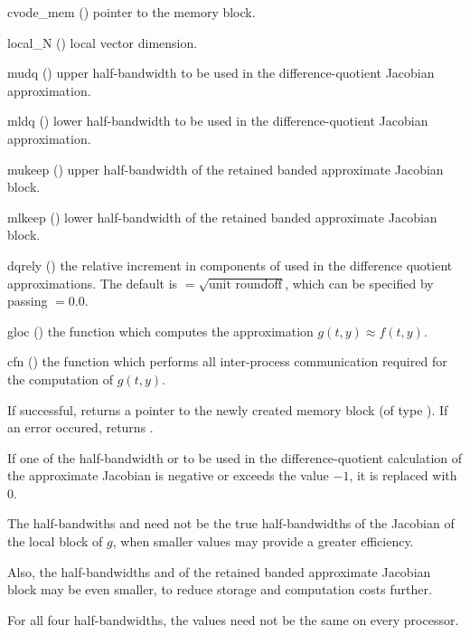 {
  \begin{args}
  \item[cvode\_mem] ()
    pointer to the {\cvode} memory block.
  \item[local\_N] ()
    local vector dimension.
  \item[mudq] ()
    upper half-bandwidth to be used in the difference-quotient Jacobian approximation.
  \item[mldq] ()
    lower half-bandwidth to be used in the difference-quotient Jacobian approximation.
  \item[mukeep] ()
    upper half-bandwidth of the retained banded approximate Jacobian block.
  \item[mlkeep] ()
    lower half-bandwidth of the retained banded approximate Jacobian block.
  \item[dqrely] ()
    the relative increment in components of  used in the difference quotient
    approximations.  The default is $ = \sqrt{\text{unit roundoff}}$, which
    can be specified by passing $ = 0.0$.
  \item[gloc] ()
    the {\C} function which computes the approximation $g(t,y) \approx f(t,y)$. 
  \item[cfn] ()
    the {\C} function which performs all inter-process communication required for
    the computation of $g(t,y)$.
  \end{args}
}
{
  If successful,  returns a pointer to the newly created 
  {\cvbbdpre} memory block (of type ).
  If an error occured,  returns .
}
{
  If one of the half-bandwidth  or  to be used in the 
  difference-quotient calculation of the approximate Jacobian is negative or 
  exceeds the value $-1$, it is replaced with 0.

  The half-bandwiths  and  need not be the true 
  half-bandwidths of the Jacobian of the local block of $g$,    
  when smaller values may provide a greater efficiency.       

  Also, the half-bandwidths  and  of the retained 
  banded approximate Jacobian block may be even smaller,      
  to reduce storage and computation costs further.            

  For all four half-bandwidths, the values need not be the    
  same on every processor.
}

